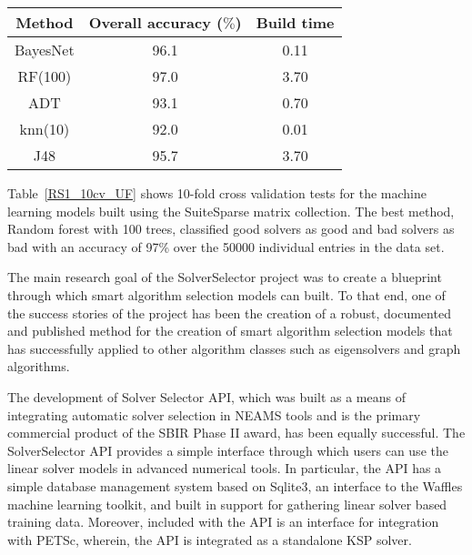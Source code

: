 \begin{table*}[h]
\centering
\caption{Convergence model accuracy and build time for 10-fold cross validation with SuiteSparse data set.}
\label{RS1_10cv_UF}
\begin{tabular}{|c|c|c|}    \hline  

Method                & Overall accuracy ($\%$)  & Build time \\ \hline\hline
BayesNet              &	96.1                    & 0.11	\\ \hline	    
RF(100)   &           97.0                    & 3.70	\\ \hline      
ADT                              &  93.1	                & 0.70	\\ \hline  
knn(10)                             &	92.0                    & 0.01	\\ \hline	    
J48                           &	95.7                    & 3.70	\\ \hline 	    
\end{tabular}
\end{table*}


Table~\ref{RS1_10cv_UF} shows 10-fold cross validation tests for the machine learning models built using the SuiteSparse matrix collection. The best method, Random forest with 100 trees, classified good solvers as good and bad solvers as bad with an accuracy of 97\% over the 50000 individual entries in the data set. 

The main research goal of the SolverSelector project was to create a blueprint through which smart algorithm selection models can built. To that end, one of the success stories of the project has been the creation of a robust, documented and published method for the creation of smart algorithm selection models that has successfully applied to other algorithm classes such as eigensolvers and graph algorithms.   

The development of Solver Selector API, which was built as a means of integrating automatic solver selection in NEAMS tools and is the primary commercial product of the SBIR Phase II award, has been equally successful. The SolverSelector API provides a simple interface through which users can use the linear solver models in advanced numerical tools. In particular, the API has a simple database management system based on Sqlite3, an interface to the Waffles machine learning toolkit, and built in support for gathering linear solver based training data. Moreover, included with the API is an interface for integration with PETSc, wherein, the API is integrated as a standalone KSP solver. 

